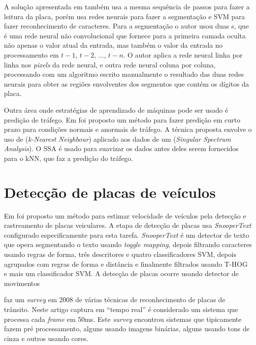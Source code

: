 A solução apresentada em
 também usa a mesma sequência de
passos para fazer a leitura da placa, porém usa redes neurais para 
fazer a segmentação e SVM para fazer reconhecimento de caracteres. Para a
segmentação o autor usou duas
s, que é uma rede neural não convolucional que
fornece para a primeira camada oculta não apenas o valor atual da entrada, mas
também o valor da entrada no processamento em $t-1$, $t-2$, ..., $t-n$. O autor
aplica a rede neural linha por linha nos \emph{pixels} da rede neural, e outra
rede neural coluna por coluna, processando com um algoritmo escrito manualmente
o resultado das duas redes neurais para obter as regiões envolventes dos
segmentos que contém os dígitos da placa.

Outra área onde estratégias de aprendizado de máquinas pode ser usado é
predição de tráfego. Em  foi proposto um método para
fazer
predição em curto prazo para condições normais e anormais de tráfego. A técnica
proposta envolve o uso de  (\emph{k-Nearest Neighbour}) aplicado aos dados de um
(\emph{Singular Spectrum Analysis}). O SSA é usado para suavizar os dados antes
deles serem fornecidos para o kNN, que faz a predição do tráfego.

\section{Detecção de placas de veículos}

Em  foi proposto um método para estimar velocidade de
veículos pela detecção e rastreamento de placas veiculares. A etapa de detecção
de placas usa \emph{SnooperText} \cite{minetto.10.icip} configurado
especificamente para esta tarefa. \emph{SnooperText} é um detector de texto
que opera segmentando o texto usando \emph{toggle mapping}, depois filtrando
caracteres usando regras de forma, três descritores e quatro classificadores
SVM, depois agrupados com regras de forma e distância e finalmente
filtrados usando T-HOG e mais um classificador SVM. A detecção de placas ocorre
usando detector de movimentos

 faz um \emph{survey} em 2008 de
várias técnicas de reconhecimento de placas de trânsito. Neste artigo
captura em ``tempo real'' é considerado um sistema que processa cada
\emph{frame} em 50ms. Este \emph{survey} encontrou sistemas 
que tipicamente fazem pré processamento, alguns usando imagens binárias,
alguns usando tons de cinza e outros usando cores.

